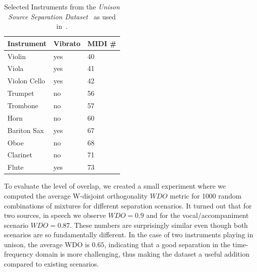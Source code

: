 \begin{table}
\begin{center}
\footnotesize
\begin{tabular}{ l l l}
  \toprule
  Instrument & Vibrato &  MIDI \# \\
  \midrule
  Violin & yes & 40 \\
  Viola & yes & 41 \\
  Violon Cello & yes & 42 \\
  Trumpet & no & 56 \\
  Trombone & no & 57\\
  Horn & no & 60  \\
  Bariton Sax & yes & 67 \\
  Oboe & no & 68\\
  Clarinet & no & 71\\
  Flute & yes & 73\\
  \bottomrule
\end{tabular}
\end{center}
\caption{Selected Instruments from the \emph{Unison Source Separation Dataset}~\cite{oss_unison} as used in~\cite{stoeter14, stoeter16}.}
\label{tab:testset}
\end{table}

To evaluate the level of overlap, we created a small experiment where we computed the average W-disjoint orthogonality \(WDO\) metric for 1000 random combinations of mixtures for different separation scenarios.
It turned out that for two sources, in speech we observe \(WDO=0.9\) and for the vocal/accompaniment scenario \(WDO=0.87\). 
These numbers are surprisingly similar even though both scenarios are so fundamentally different.
In the case of two instruments playing in unison, the average WDO is \(0.65\), indicating that a good separation in the time-frequency domain is more challenging, thus making the dataset a useful addition compared to existing scenarios.


